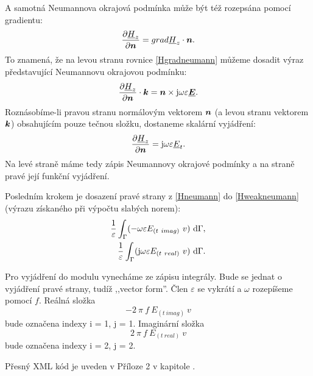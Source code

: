 \documentclass[12pt,a4paper,oneside]{article}
\numberwithin{equation}{section} %
\numberwithin{figure}{section} %
\numberwithin{table}{section} %
\newcommand{\mj}{\mathrm{j}} %
\renewcommand{\vec}[1]{\mbox{\boldmath$#1$}} %
\newcommand{\faz}[1]{{\underline{#1}}} %
\begin{document}
A samotná Neumannova okrajová podmínka může být též rozepsána pomocí gradientu:
\begin{equation}
\label{Hgradneumann}
\frac{\partial \faz{H}_z}{\partial \vec{n}} = grad \faz{H}_z \cdot \vec{n} .
\end{equation}
To znamená, že na levou stranu rovnice \ref{Hgradneumann} můžeme dosadit výraz představující Neumannovu okrajovou podmínku:
\begin{equation}
\label{NeumannHKvek}
\frac{\partial \faz{H}_z}{\partial \vec{n}} \cdot \vec{k} = \vec{n} \times \mj \omega \varepsilon \faz{\vec{E}}.
\end{equation}
Roznásobíme-li pravou stranu normálovým vektorem $\vec{n}$ (a levou stranu vektorem $\vec{k}$) obsahujícím pouze tečnou složku, dostaneme skalární vyjádření:
\begin{equation}
\label{Hneumann}
\frac{\partial \faz{H}_z}{\partial \vec{n}} = \mj \omega \varepsilon \faz{E}_t .
\end{equation}
Na levé straně máme tedy zápis Neumannovy okrajové podmínky a na straně pravé její funkční vyjádření.

Posledním krokem je dosazení pravé strany z \ref{Hneumann} do \ref{Hweakneumann} (výrazu získaného při výpočtu slabých norem):
\begin{subequations}
\begin{align}
\frac{1}{\varepsilon} \int _{\Gamma} (- \omega \varepsilon E_{(t~imag)} ~ v ) ~ \ud \Gamma ,
\\ 
\frac{1}{\varepsilon} \int _{\Gamma} (\mj \omega \varepsilon E_{(t~real)} ~ v ) ~ \ud \Gamma .
\end{align}
\end{subequations}

Pro vyjádření do modulu vynecháme ze zápisu integrály. Bude se jednat o vyjádření pravé strany, tudíž ,,vector form''. Člen $\varepsilon$ se vykrátí a $\omega$ rozepíšeme pomocí $f$. Reálná složka  
\begin{equation}
- 2 ~ \pi ~ f ~ E_{(t~imag)} ~ v
\end{equation} 
bude označena indexy i = 1, j = 1. Imaginární složka 
\begin{equation}
2 ~ \pi ~ f ~ E_{(t~real)} ~ v
\end{equation}
bude označena indexy i = 2, j = 2.

Přesný XML kód je uveden v Příloze 2 v kapitole .
\end{document}
